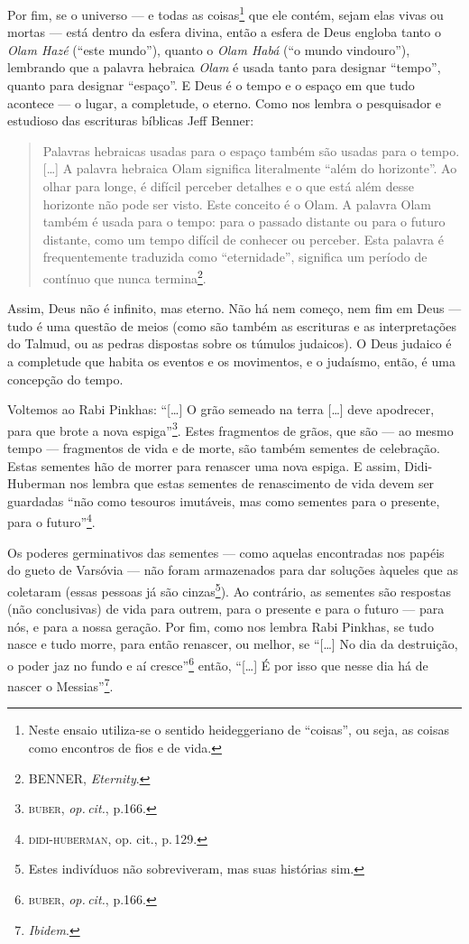 Por fim, se o universo --- e todas as coisas\footnote{Neste ensaio
  utiliza-se o sentido heideggeriano de ``coisas'', ou seja, as coisas
  como encontros de fios e de vida.} que ele contém, sejam elas vivas ou
mortas --- está dentro da esfera divina, então a esfera de Deus engloba
tanto o \emph{Olam Hazé} (``este mundo''), quanto o \emph{Olam Habá}
(``o mundo vindouro''), lembrando que a palavra hebraica \emph{Olam} é
usada tanto para designar ``tempo'', quanto para designar ``espaço''. E
Deus é o tempo e o espaço em que tudo acontece --- o lugar, a
completude, o eterno. Como nos lembra o pesquisador e estudioso das
escrituras bíblicas Jeff Benner:

\begin{quote}
Palavras hebraicas usadas para o espaço também são usadas para o tempo.
{[}\ldots{}{]} A palavra hebraica Olam significa literalmente ``além do
horizonte''. Ao olhar para longe, é difícil perceber detalhes e o que
está além desse horizonte não pode ser visto. Este conceito é o Olam. A
palavra Olam também é usada para o tempo: para o passado distante ou
para o futuro distante, como um tempo difícil de conhecer ou perceber.
Esta palavra é frequentemente traduzida como ``eternidade'', significa
um período de contínuo que nunca termina\footnote{BENNER,
  \emph{Eternity}.}.
\end{quote}

Assim, Deus não é infinito, mas eterno. Não há nem começo, nem fim em
Deus --- tudo é uma questão de meios (como são também as escrituras e as
interpretações do Talmud, ou as pedras dispostas sobre os
túmulos judaicos). O Deus judaico é a completude que habita os eventos e
os movimentos, e o judaísmo, então, é uma concepção do tempo.

Voltemos ao Rabi Pinkhas: ``{[}\ldots{}{]} O grão semeado na terra
{[}\ldots{}{]} deve apodrecer, para que brote a nova espiga''\footnote{\textsc{buber},
  \emph{op.\,cit.}, p.166.}. Estes fragmentos de grãos, que são --- ao mesmo
tempo --- fragmentos de vida e de morte, são também sementes de
celebração. Estas sementes hão de morrer para renascer uma nova espiga.
E assim, Didi-Huberman nos lembra que estas sementes de renascimento de
vida devem ser guardadas ``não como tesouros imutáveis, mas como
sementes para o presente, para o futuro''\footnote{\textsc{didi-huberman}, op.
  cit., p.\,129.}.

Os poderes germinativos das sementes --- como aquelas encontradas nos
papéis do gueto de Varsóvia --- não foram armazenados para dar soluções
àqueles que as coletaram (essas pessoas já são cinzas\footnote{Estes
  indivíduos não sobreviveram, mas suas histórias sim.}). Ao contrário,
as sementes são respostas (não conclusivas) de vida para outrem, para o
presente e para o futuro --- para nós, e para a nossa geração. Por fim,
como nos lembra Rabi Pinkhas, se tudo nasce e tudo morre, para então
renascer, ou melhor, se ``{[}\ldots{}{]} No dia da destruição, o poder
jaz no fundo e aí cresce''\footnote{\textsc{buber}, \emph{op.\,cit.}, p.166.}
então, ``{[}\ldots{}{]} É por isso que nesse dia há de nascer o
Messias''\footnote{\emph{Ibidem}.}.

